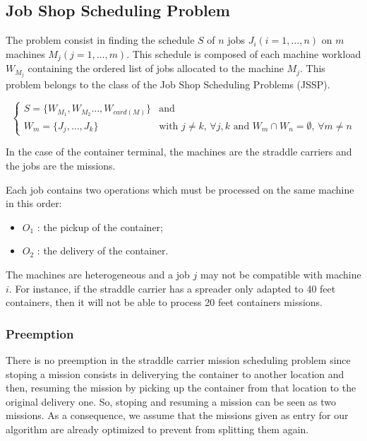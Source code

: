 \documentclass[a4paper,10pt]{article}
\begin{document}
\subsection{Job Shop Scheduling Problem}

The problem consist in finding the schedule $S$ of $n$ jobs $J_i(i=1,\ldots,n)$ on $m$ machines $M_j(j=1,\ldots,m)$. 
This schedule is composed of each machine workload $W_{M_j}$ containing the ordered list of jobs allocated to the machine $M_j$. This problem belongs to the class of the Job Shop Scheduling Problems (JSSP).

\begin{equation*}
\begin{cases}
 S = \{ W_{M_1} , W_{M_2} \ldots , W_{card(M)}\} & \text{and}\\
 W_{m} = \{ J_j , \ldots , J_k \} & \text{with $j \neq k$, $\forall j,k$ and $W_{m} \cap W_{n} = \emptyset$,  $\forall m \neq n$} 
\end{cases}
\end{equation*}

In the case of the container terminal, the machines are the straddle carriers and the jobs are the missions.
 
Each job contains two operations which must be processed on the same machine in this order:
\begin{itemize}
 \item $O_1$ : the pickup of the container;
 \item $O_2$ : the delivery of the container.
\end{itemize}

The machines are heterogeneous and a job $j$ may not be compatible with machine $i$. For instance, if the straddle carrier has a spreader only adapted to 40 feet containers, then it will not be able to process 20 feet containers missions.

\subsubsection{Preemption}
There is no preemption in the straddle carrier mission scheduling problem since stoping a mission consists in deliverying the container to another location and then, resuming the mission by picking up the container from that location to the original delivery one. So, stoping and resuming a mission can be seen as two missions. As a consequence, we assume that the missions given as entry for our algorithm are already optimized to prevent from splitting them again.
\end{document}
